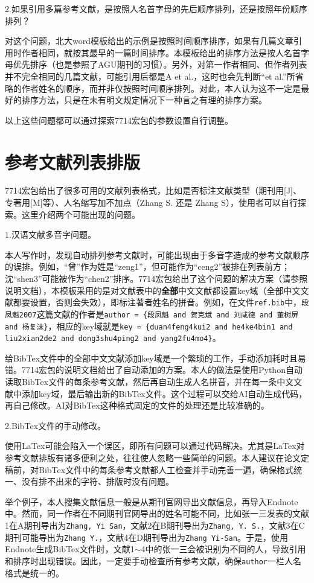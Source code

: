 2.如果引用多篇参考文献，是按照人名首字母的先后顺序排列，还是按照年份顺序排列？

对这个问题，北大word模板给出的示例是按照时间顺序排序，如果有几篇文章引用时作者相同，就按其最早的一篇时间排序。本模板给出的排序方法是按人名首字母优先排序（也是参照了AGU期刊的习惯）。另外，对第一作者相同、但作者列表并不完全相同的几篇文献，可能引用后都是A et al.，这时也会先判断“et al.”所省略的作者姓名的顺序，而并非仅按照时间顺序排列。对此，本人认为这不一定是最好的排序方法，只是在未有明文规定情况下一种言之有理的排序方案。

以上这些问题都可以通过探索7714宏包的参数设置自行调整。

\section{参考文献列表排版}

7714宏包给出了很多可用的文献列表格式，比如是否标注文献类型（期刊用[J]、专著用[M]等）、人名缩写加不加点（Zhang S. 还是 Zhang S），使用者可以自行探索。这里介绍两个可能出现的问题。

1.汉语文献多音字问题。

本人写作时，发现自动排列参考文献时，可能出现由于多音字造成的参考文献顺序的误排。例如，“曾”作为姓是“zeng1”，但可能作为“ceng2”被排在列表前方；沈“shen3”可能被作为“chen2”排序。7714宏包给出了这个问题的解决方案（请参照说明文档），本模板采用的是对文献表中的\textbf{全部}中文文献都设置key域（全部中文文献都要设置，否则会失效），即标注著者姓名的拼音。例如，在文件\texttt{ref.bib}中，\texttt{段凤魁2007}这篇文献的作者是\texttt{author = \{段凤魁 and 贺克斌 and 刘咸德 and 董树屏 and 杨复沫\}}，相应的key域就是\texttt{key = \{duan4feng4kui2 and he4ke4bin1 and liu2xian2de2 and dong3shu4ping2 and yang2fu4mo4\}}。

给BibTex文件中的全部中文文献添加key域是一个繁琐的工作，手动添加耗时且易错。7714宏包的说明文档给出了自动添加的方案。本人的做法是使用Python自动读取BibTex文件的每条参考文献，然后再自动生成人名拼音，并在每一条中文文献中添加key域，最后输出新的BibTex文件。这个过程可以交给AI自动生成代码，再自己修改。AI对BibTex这种格式固定的文件的处理还是比较准确的。

2.BibTex文件的手动修改。

使用LaTex可能会陷入一个误区，即所有问题可以通过代码解决。尤其是LaTex对参考文献排版有诸多便利之处，往往使人忽略一些简单的问题。本人建议在论文定稿前，对BibTex文件中的每条参考文献都人工检查并手动完善一遍，确保格式统一、没有排不出来的字符、排版时没有问题。

举个例子，本人搜集文献信息一般是从期刊官网导出文献信息，再导入Endnote中。然而，同一作者在不同期刊官网导出的姓名可能不同，比如张一三发表的文献1在A期刊导出为\texttt{Zhang, Yi San}，文献2在B期刊导出为\texttt{Zhang, Y. S.}，文献3在C期刊可能导出为\texttt{Zhang Y.}，文献4在D期刊导出为\texttt{Zhang Yi-San}。于是，使用Endnote生成BibTex文件时，文献1$\sim$4中的张一三会被识别为不同的人，导致引用和排序时出现错误。因此，一定要手动检查所有参考文献，确保\texttt{author}一栏人名格式是统一的。
